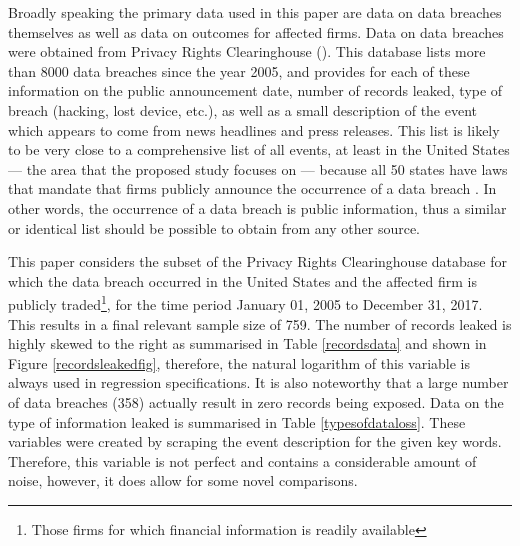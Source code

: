 \documentclass[../Main.tex]{subfiles}
\begin{document}
Broadly speaking the primary data used in this paper are data on data breaches themselves as well as data on outcomes for affected firms. Data on data breaches were obtained from Privacy Rights Clearinghouse (\citeyear{privacyrightsclearinghouse2018}). This database lists more than 8000 data breaches since the year 2005, and provides for each of these information on the public announcement date, number of records leaked, type of breach (hacking, lost device, etc.), as well as a small description of the event which appears to come from news headlines and press releases. This list is likely to be very close to a comprehensive list of all events, at least in the United States --- the area that the proposed study focuses on --- because all 50 states have laws that mandate that firms publicly announce the occurrence of a data breach \citep{ncsl2018}. In other words, the occurrence of a data breach is public information, thus a similar or identical list should be possible to obtain from any other source. 

This paper considers the subset of the Privacy Rights Clearinghouse database for which the data breach occurred in the United States and the affected firm is publicly traded\footnote{Those firms for which financial information is readily available}, for the time period January 01, 2005 to December 31, 2017. This results in a final relevant sample size of 759. The number of records leaked is highly skewed to the right as summarised in Table \ref{recordsdata} and shown in Figure \ref{recordsleakedfig}, therefore, the natural logarithm of this variable is always used in regression specifications. It is also noteworthy that a large number of data breaches (358) actually result in zero records being exposed. Data on the type of information leaked is summarised in Table \ref{typesofdataloss}. These variables were created by scraping the event description for the given key words. Therefore, this variable is not perfect and contains a considerable amount of noise, however, it does allow for some novel comparisons.
\end{document}
